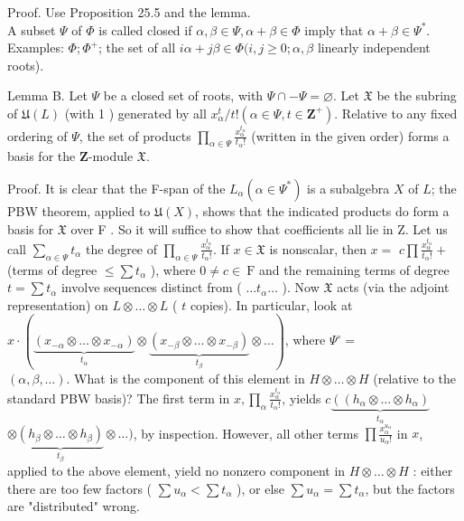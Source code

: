 \documentclass[10pt]{article}
\begin{document}
Proof. Use Proposition 25.5 and the lemma.\\
A subset $\Psi$ of $\Phi$ is called closed if $\alpha, \beta \in \Psi, \alpha+\beta \in \Phi$ imply that $\alpha+\beta \in \Psi^{*}$. Examples: $\Phi ; \Phi^{+}$; the set of all $i \alpha+j \beta \in \Phi(i, j \geq 0 ; \alpha, \beta$ linearly independent roots).

Lemma B. Let $\Psi$ be a closed set of roots, with $\Psi \cap-\Psi=\varnothing$. Let $\mathfrak{X}$ be the subring of $\mathfrak{U}(L)$ (with 1 ) generated by all $x_{\alpha}^{t} / t!\left(\alpha \in \Psi, t \in \mathbf{Z}^{+}\right)$. Relative to any fixed ordering of $\Psi$, the set of products $\prod_{\alpha \in \Psi} \frac{x_{\alpha}^{t_{\alpha}}}{t_{\alpha}!}$ (written in the given order) forms a basis for the $\mathbf{Z}$-module $\mathfrak{X}$.

Proof. It is clear that the F-span of the $L_{\alpha}\left(\alpha \in \Psi^{*}\right)$ is a subalgebra $X$ of $L$; the PBW theorem, applied to $\mathfrak{U}(X)$, shows that the indicated products do form a basis for $\mathfrak{X}$ over F . So it will suffice to show that coefficients all lie in Z. Let us call $\sum_{\alpha \in \Psi} t_{\alpha}$ the degree of $\prod_{\alpha \in \Psi} \frac{x_{\alpha}^{t_{\alpha}}}{t_{\alpha}!}$. If $x \in \mathfrak{X}$ is nonscalar, then $x=$ $c \prod \frac{x_{\alpha}^{t_{\alpha}}}{t_{\alpha}!}+$ (terms of degree $\leq \sum t_{\alpha}$ ), where $0 \neq c \in \mathrm{~F}$ and the remaining terms of degree $t=\sum t_{\alpha}$ involve sequences distinct from ( $\ldots t_{\alpha} \ldots$ ). Now $\mathfrak{X}$ acts (via the adjoint representation) on $L \otimes \ldots \otimes L$ ( $t$ copies). In particular, look at $x \cdot(\underbrace{\left(x_{-\alpha} \otimes \ldots \otimes x_{-\alpha}\right)}_{t_{\alpha}} \otimes \underbrace{\left(x_{-\beta} \otimes \ldots \otimes x_{-\beta}\right)}_{t_{\beta}} \otimes \ldots)$, where $\Psi^{\circ}=$\\
$(\alpha, \beta, \ldots)$. What is the component of this element in $H \otimes \ldots \otimes H$ (relative to the standard PBW basis)? The first term in $x, \prod_{\alpha} \frac{x_{\alpha}^{t_{\alpha}}}{t_{\alpha}!}$, yields $c \underbrace{\left(\left(h_{\alpha} \otimes \ldots \otimes h_{\alpha}\right)\right.}_{t_{\alpha}}$ $\otimes \underbrace{\left(h_{\beta} \otimes \ldots \otimes h_{\beta}\right)}_{t_{\beta}} \otimes \ldots)$, by inspection. However, all other terms $\prod \frac{x_{\alpha}^{u_{\alpha}}}{u_{\alpha}!}$ in $x$, applied to the above element, yield no nonzero component in $H \otimes \ldots \otimes H$ : either there are too few factors ( $\sum u_{\alpha}<\sum t_{\alpha}$ ), or else $\sum u_{\alpha}=\sum t_{\alpha}$, but the factors are "distributed" wrong.
\end{document}
